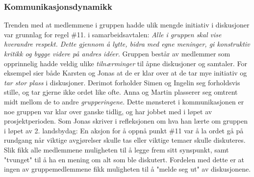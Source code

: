 \subsubsection{Kommunikasjonsdynamikk}

Trenden med at medlemmene i gruppen hadde ulik mengde initiativ i diskusjoner var grunnlag for regel \#11. i samarbeidsavtalen: \textit{Alle i gruppen skal vise hverandre respekt.
Dette gjennom å lytte, bidra med egne meninger, gi konstruktiv kritikk og bygge videre på andres id\'{e}er.} 
Gruppen består av medlemmer som opprinnelig hadde veldig ulike \textit{tilnærminger} til åpne diskusjoner og samtaler.
For eksempel sier både Karsten og Jonas at de er klar over at de tar mye initiativ og \textit{tar stor plass} i diskusjoner.
Derimot forholder Simen og Ingelin seg forholdsvis stille, og tar gjerne ikke ordet like ofte.
Anna og Martin plasserer seg omtrent midt mellom de to andre \textit{grupperingene}.
Dette mønsteret i kommunikasjonen er noe gruppen var klar over ganske tidlig, og har jobbet med i løpet av prosjektperioden.
Som Jonas skriver i refleksjonen om hva han lærte om gruppen i løpet av 2. landsbydag:
En aksjon for å oppnå punkt \#11 var å la ordet gå på rundgang når viktige avgjørelser skulle tas eller viktige temaer skulle diskuteres.
Slik fikk alle medlemmene muligheten til å legge frem sitt synspunkt, samt "tvunget" til å ha en mening om alt som ble diskutert.
Fordelen med dette er at ingen av gruppemedlemmene fikk muligheten til å "melde seg ut" av diskusjonene. \\

